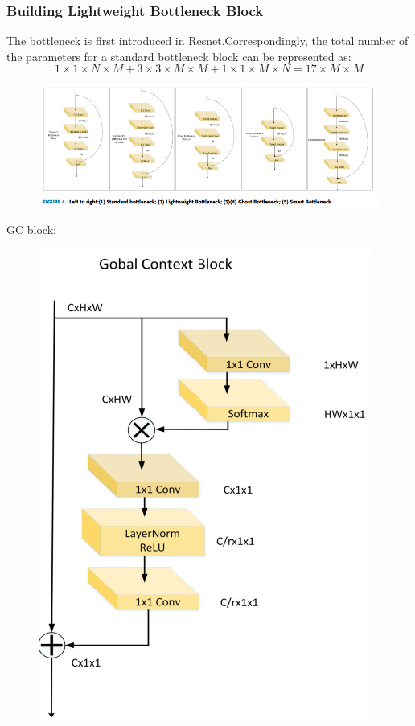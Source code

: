 \documentclass[11pt]{article}
\begin{document}
\subsubsection{Building Lightweight Bottleneck Block}
The bottleneck is first introduced in Resnet.Correspondingly, the total number of the parameters for a standard bottleneck block can be represented as:
$$1\times 1\times N\times M + 3\times 3\times M\times M + 1\times 1\times M\times N = 17\times M\times M$$

\begin{figure}[H]
	\centering
	\includegraphics[scale = 0.5]{80}
\end{figure}

GC block:
\begin{figure}[H]
	\centering
	\includegraphics[scale = 0.5]{81}
\end{figure}
\end{document}
